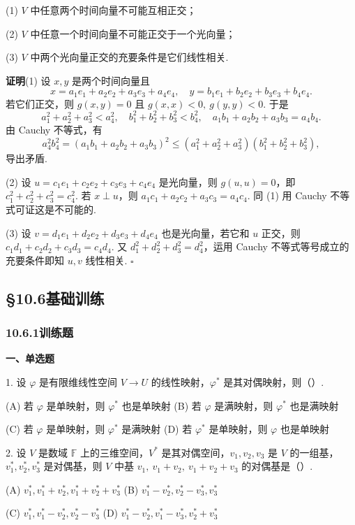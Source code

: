 \documentclass[UTF8, 12pt, fontset=fandol, oneside]{ctexart}
\begin{document}
(1) $V$ 中任意两个时间向量不可能互相正交；

(2) $V$ 中任意一个时间向量不可能正交于一个光向量；

(3) $V$ 中两个光向量正交的充要条件是它们线性相关.

\noindent\textbf{证明}\quad (1) 设 $x,y$ 是两个时间向量且
\[
x=a_1e_1+a_2e_2+a_3e_3+a_4e_4,\quad
y=b_1e_1+b_2e_2+b_3e_3+b_4e_4.
\]
若它们正交，则 $g(x,y)=0$ 且 $g(x,x)<0,\ g(y,y)<0$. 于是
\[
a_1^2+a_2^2+a_3^2<a_4^2,\quad
b_1^2+b_2^2+b_3^2<b_4^2,\quad
a_1b_1+a_2b_2+a_3b_3=a_4b_4.
\]
由 Cauchy 不等式，有
\[
a_4^2b_4^2=(a_1b_1+a_2b_2+a_3b_3)^2
\le (a_1^2+a_2^2+a_3^2)(b_1^2+b_2^2+b_3^2),
\]
导出矛盾.

(2) 设 $u=c_1e_1+c_2e_2+c_3e_3+c_4e_4$ 是光向量，则 $g(u,u)=0$，即 $c_1^2+c_2^2+c_3^2=c_4^2$. 若 $x\perp u$，则 $a_1c_1+a_2c_2+a_3c_3=a_4c_4$. 同 (1) 用 Cauchy 不等式可证这是不可能的.

(3) 设 $v=d_1e_1+d_2e_2+d_3e_3+d_4e_4$ 也是光向量，若它和 $u$ 正交，则 $c_1d_1+c_2d_2+c_3d_3=c_4d_4$. 又 $d_1^2+d_2^2+d_3^2=d_4^2$，运用 Cauchy 不等式等号成立的充要条件即知 $u,v$ 线性相关. $\square$

\subsection*{§10.6\quad 基础训练}

\subsubsection*{10.6.1\quad 训练题}

\noindent\textbf{一、单选题}

1. 设 $\varphi$ 是有限维线性空间 $V\to U$ 的线性映射，$\varphi^*$ 是其对偶映射，则（\quad ）.

(A) 若 $\varphi$ 是单映射，则 $\varphi^*$ 也是单映射
\quad
(B) 若 $\varphi$ 是满映射，则 $\varphi^*$ 也是满映射

(C) 若 $\varphi$ 是单映射，则 $\varphi^*$ 是满映射
\quad
(D) 若 $\varphi^*$ 是单映射，则 $\varphi$ 也是单映射

2. 设 $V$ 是数域 $\mathbb{F}$ 上的三维空间，$V^*$ 是其对偶空间，$v_1,v_2,v_3$ 是 $V$ 的一组基，$v_1^*,v_2^*,v_3^*$ 是对偶基，则 $V$ 中基 $v_1,\ v_1+v_2,\ v_1+v_2+v_3$ 的对偶基是（\quad ）.

(A) $v_1^*,v_1^*+v_2^*,v_1^*+v_2^*+v_3^*$
\quad
(B) $v_1^*-v_2^*,v_2^*-v_3^*,v_3^*$

(C) $v_1^*,v_1^*-v_2^*,v_2^*-v_3^*$
\quad
(D) $v_1^*-v_2^*,v_1^*-v_3^*,v_2^*+v_3^*$
\end{document}

